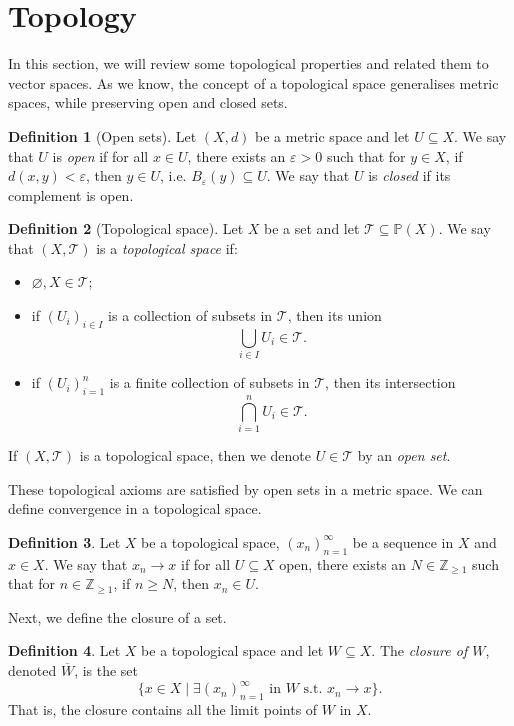 \documentclass[a4paper, openany]{memoir}
\theoremstyle{definition}
\newtheorem{definition}{Definition}[section]
\theoremstyle{plain}
\begin{document}
    \section{Topology}
    In this section, we will review some topological properties and related them to vector spaces. As we know, the concept of a topological space generalises metric spaces, while preserving open and closed sets.
    \begin{definition}[Open sets]
        Let $(X, d)$ be a metric space and let $U \subseteq X$. We say that $U$ is \emph{open} if for all $x \in U$, there exists an $\varepsilon > 0$ such that for $y \in X$, if $d(x, y) < \varepsilon$, then $y \in U$, i.e. $B_\varepsilon(y) \subseteq U$. We say that $U$ is \emph{closed} if its complement is open.
    \end{definition}
    \begin{definition}[Topological space]
        Let $X$ be a set and let $\mathcal{T} \subseteq \mathbb{P}(X)$. We say that $(X, \mathcal{T})$ is a \emph{topological space} if:
        \begin{itemize}
            \item $\varnothing, X \in \mathcal{T}$;
            \item if $(U_i)_{i \in I}$ is a collection of subsets in $\mathcal{T}$, then its union
            \[\bigcup_{i \in I} U_i \in \mathcal{T}.\]
            \item if $(U_i)_{i=1}^n$ is a finite collection of subsets in $\mathcal{T}$, then its intersection
            \[\bigcap_{i=1}^n U_i \in \mathcal{T}.\]
        \end{itemize}
        If $(X, \mathcal{T})$ is a topological space, then we denote $U \in \mathcal{T}$ by an \emph{open set}.
    \end{definition}
    \noindent These topological axioms are satisfied by open sets in a metric space. We can define convergence in a topological space.
    \begin{definition}
        Let $X$ be a topological space, $(x_n)_{n=1}^\infty$ be a sequence in $X$ and $x \in X$. We say that $x_n \to x$ if for all $U \subseteq X$ open, there exists an $N \in \mathbb{Z}_{\geq 1}$ such that for $n \in \mathbb{Z}_{\geq 1}$, if $n \geq N$, then $x_n \in U$.
    \end{definition}
    \noindent Next, we define the closure of a set.
    \begin{definition}
        Let $X$ be a topological space and let $W \subseteq X$. The \emph{closure of $W$}, denoted $\overline{W}$, is the set
        \[\{x \in X \mid \exists (x_n)_{n=1}^\infty \textrm{ in } W \textrm{ s.t. } x_n \to x\}.\]
        That is, the closure contains all the limit points of $W$ in $X$.
    \end{definition}
\end{document}
